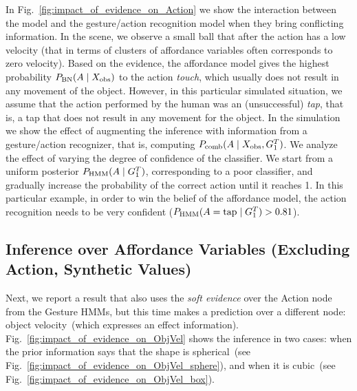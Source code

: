 In Fig.~\ref{fig:impact_of_evidence_on_Action} we show the interaction between the \AffWords{} model and the gesture/action recognition model when they bring conflicting information.
In the scene, we observe a small ball that after the action has a low velocity (that in terms of clusters of affordance variables often corresponds to zero velocity).
Based on the evidence, the affordance model gives the highest probability $P_{\text{BN}}(A \mid X_\text{obs})$ to the action \emph{touch}, which usually does not result in any movement of the object.
However, in this particular simulated situation, we assume that the action performed by the human was an (unsuccessful) \emph{tap}, that is, a tap that does not result in any movement for the object.
In the simulation we show the effect of augmenting the inference with information from a gesture/action recognizer, that is, computing $P_\text{comb}(A \mid X_\text{obs},G_1^T)$.
We analyze the effect of varying the degree of confidence of the classifier.
We start from a uniform posterior $P_{\text{HMM}}(A \mid G_1^T)$, corresponding to a poor classifier, and gradually increase the probability of the correct action until it reaches 1.
In this particular example, in order to win the belief of the affordance model, the action recognition needs to be very confident ($P_{\text{HMM}}(A=\text{tap} \mid G_1^T) > 0.81$).

\subsection{Inference over Affordance Variables (Excluding Action, Synthetic Values)}

\begin{figure*}
\centering
{} \quad
%
\caption{Predictions about the object velocity of different objects, when given probabilistic soft evidence about the action.}
\label{fig:impact_of_evidence_on_ObjVel}
\end{figure*}

Next, we report a result that also uses the \emph{soft evidence} over the Action node from the Gesture \acp{HMM}, but this time makes a prediction over a different node: object velocity~(which expresses an effect information).
Fig.~\ref{fig:impact_of_evidence_on_ObjVel} shows the inference in two cases: when the prior information says that the shape is spherical~(see Fig.~\ref{fig:impact_of_evidence_on_ObjVel_sphere}), and when it is cubic~(see Fig.~\ref{fig:impact_of_evidence_on_ObjVel_box}).

